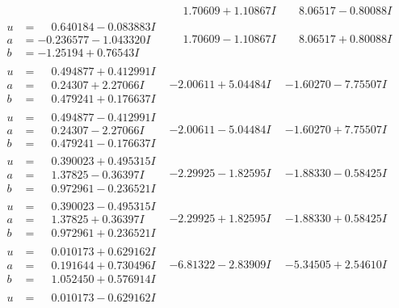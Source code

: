 \documentclass[1p]{elsarticle_modified}
\theoremstyle{definition}
\begin{document}
$$\begin{array}{c|c|c}
 & \phantom{-}1.70609 + 1.10867 I & \phantom{-}8.06517 - 0.80088 I \\ \hline\begin{aligned}
u &= \phantom{-}0.640184 - 0.083883 I \\
a &= -0.236577 - 1.043320 I \\
b &= -1.25194 + 0.76543 I\end{aligned}
 & \phantom{-}1.70609 - 1.10867 I & \phantom{-}8.06517 + 0.80088 I \\ \hline\begin{aligned}
u &= \phantom{-}0.494877 + 0.412991 I \\
a &= \phantom{-}0.24307 + 2.27066 I \\
b &= \phantom{-}0.479241 + 0.176637 I\end{aligned}
 & -2.00611 + 5.04484 I & -1.60270 - 7.75507 I \\ \hline\begin{aligned}
u &= \phantom{-}0.494877 - 0.412991 I \\
a &= \phantom{-}0.24307 - 2.27066 I \\
b &= \phantom{-}0.479241 - 0.176637 I\end{aligned}
 & -2.00611 - 5.04484 I & -1.60270 + 7.75507 I \\ \hline\begin{aligned}
u &= \phantom{-}0.390023 + 0.495315 I \\
a &= \phantom{-}1.37825 - 0.36397 I \\
b &= \phantom{-}0.972961 - 0.236521 I\end{aligned}
 & -2.29925 - 1.82595 I & -1.88330 - 0.58425 I \\ \hline\begin{aligned}
u &= \phantom{-}0.390023 - 0.495315 I \\
a &= \phantom{-}1.37825 + 0.36397 I \\
b &= \phantom{-}0.972961 + 0.236521 I\end{aligned}
 & -2.29925 + 1.82595 I & -1.88330 + 0.58425 I \\ \hline\begin{aligned}
u &= \phantom{-}0.010173 + 0.629162 I \\
a &= \phantom{-}0.191644 + 0.730496 I \\
b &= \phantom{-}1.052450 + 0.576914 I\end{aligned}
 & -6.81322 - 2.83909 I & -5.34505 + 2.54610 I \\ \hline\begin{aligned}
u &= \phantom{-}0.010173 - 0.629162 I \\

\end{aligned}
\end{array}$$
\end{document}
